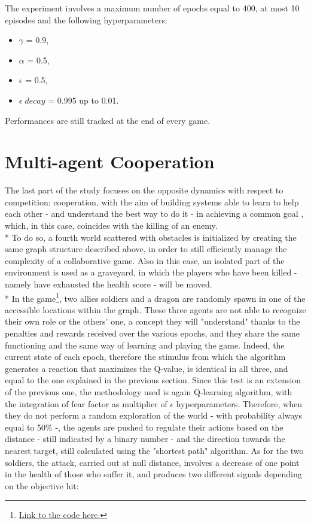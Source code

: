 The experiment involves a maximum number of epochs equal to 400,
at most 10 episodes and the following hyperparameters:
\begin{itemize}
  \item $\gamma$ = 0.9,
  \item $\alpha$ = 0.5,
  \item $\epsilon$ = 0.5,
  \item $\epsilon\;decay$ = 0.995 up to 0.01.
\end{itemize}
Performances are still tracked at the end of every game.

\section{Multi-agent Cooperation}
The last part of the study focuses on the opposite dynamics with respect to competition: cooperation, with the aim of building systems able to learn to help each other - and understand the best way to do it - in achieving a common goal , which, in this case, coincides with the killing of an enemy.\\*
To do so, a fourth world scattered with obstacles is initialized by creating the same graph structure described above, in order to still efficiently manage the complexity of a collaborative game. Also in this case, an isolated part of the environment is used as a graveyard, in which the players who have been killed - namely have exhausted the health score - will be moved.\\*
In the game\footnote{\href{https://github.com/moiraghif/DragonHunting/tree/master/TeamWork}{Link to the code here.}}, two allies soldiers and a dragon are randomly spawn in one of the accessible locations within the graph. These three agents are not able to recognize their own role or the others' one, a concept they will "understand" thanks to the penalties and rewards received over the various epochs, and they share the same functioning and the same way of learning and playing the game. Indeed, the current state of each epoch, therefore the stimulus from which the algorithm generates a reaction that maximizes the Q-value, is identical in all three, and equal to the one explained in the previous section. Since this test is an extension of the previous one, the methodology used is again Q-learning algorithm, with the integration of fear factor as multiplier of $\epsilon$ hyperparameters. Therefore, when they do not perform a random exploration of the world - with probability always equal to 50\% -, the agents are pushed to regulate their actions based on the distance - still indicated by a binary number - and the direction towards the nearest target, still calculated using the "shortest path" algorithm. As for the two soldiers, the attack, carried out at null distance, involves a decrease of one point in the health of those who suffer it, and produces two different signals depending on the objective hit:
